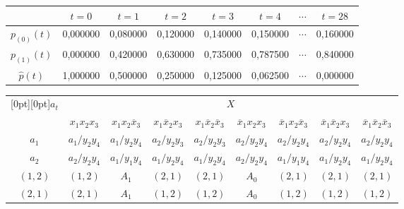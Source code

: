 \begin{multicols}{2}
\begin{table*}
\begin{center}
\tabcolsep=10pt
\begin{tabular}{|c|c|c|c|c|c|c|c|}
\hline
& $t=0$ & $t=1$ &  $t=2$ & $t=3$ & $t=4$ & $\cdots$ & $t=28$ \\
\hline
$p_{(0)}(t)$ & 0,000000 & 0,080000 & 0,120000 & 0,140000 & 0,150000 & $\cdots$ & 
0,160000\\
$p_{(1)}(t)$ & 0,000000 & 0,420000 & 0,630000 & 0,735000 & 0,787500 & $\cdots$ & 
0,840000\\
$\hat{p}(t)$ & 1,000000 & 0,500000 & 0,250000 & 0,125000 & 0,062500 & $\cdots$ & 
0,000000\\
\hline
\end{tabular}
\end{center}
\vspace*{9pt}
\end{table*}

\begin{table*}[b]\small %
\begin{center}
\vspace*{2ex}

\tabcolsep=9pt
\begin{tabular}{|c|c|c|c|c|c|c|c|c|}
\hline
\multicolumn{1}{|c|}{\raisebox{-6pt}[0pt][0pt]{$a_t$}} &\multicolumn{8}{c|}{$X$}\\
\cline{2-9}
&$x_1x_2x_3$&$x_1x_2\overline{x}_3$ 
&$x_1\overline{x}_2x_3$&$x_1\overline{x}_2\overline{x}_3$ 
&$\overline{x}_1x_2x_3$&$\overline{x}_1x_2\overline{x}_3$&$\overline{x}_1\overline{x}_2x_3$&$\overline{x}_1\overline{x}_2\overline{x}_3$\\
\hline
$a_1$&$a_1/y_2y_4$&$a_1/y_2y_4$&$a_2/y_2y_3$&$a_2/y_2y_3$&$a_2/y_2y_4$&$a_2/y_2y_4$&$a_2/y_2y_4$&$a_2/y_2
y_4$\\
$a_2$&$a_2/y_2y_4$&$a_1/y_1y_4$&$a_1/y_2y_4$&$a_1/y_2y_4$&$a_2/y_2y_4$&$a_1/y_1y_4$&$a_1/y_2y_4$&$a_1/y_2
y_4$\\
$(1,2)$&$(1,2)$&$A_1$&$(2,1)$&$(2,1)$&$A_0$&$(2,1)$&$(2,1)$&$(2,1)$\\
$(2,1)$&$(2,1)$&$A_1$&$(1,2)$&$(1,2)$ &$A_0$&$(1,2)$&$(1,2)$&$(1,2)$\\
\hline
\end{tabular}
\end{center}
\begin{center}
\vspace*{2ex}


\end{center}
\end{table*}
\end{multicols}
